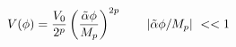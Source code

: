 \begin{equation}
V(\phi)={V_0 \over 2^p}\left(\tilde{\alpha} \phi \over M_p \right)^{2p}~~~~~~|\tilde{\alpha} \phi/M_p|~<<1
\end{equation}

